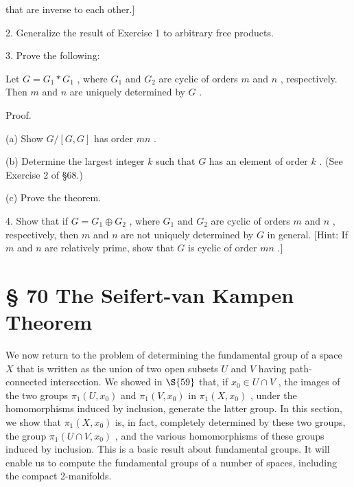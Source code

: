 that are inverse to each other.]

2. Generalize the result of Exercise 1 to arbitrary free products.

3. Prove the following:

\begin{theorem} Let \(G = {G}_{1} * {G}_{1}\) , where \({G}_{1}\) and \({G}_{2}\) are cyclic of orders \(m\) and \(n\) , respectively. Then \(m\) and \(n\) are uniquely determined by \(G\) .
\end{theorem}

Proof.

(a) Show \(G/\left\lbrack  {G,G}\right\rbrack\) has order \({mn}\) .

(b) Determine the largest integer \(k\) such that \(G\) has an element of order \(k\) . (See Exercise 2 of  \S 68.)

(c) Prove the theorem.

4. Show that if \(G = {G}_{1} \oplus  {G}_{2}\) , where \({G}_{1}\) and \({G}_{2}\) are cyclic of orders \(m\) and \(n\) , respectively, then \(m\) and \(n\) are not uniquely determined by \(G\) in general. [Hint: If \(m\) and \(n\) are relatively prime, show that \(G\) is cyclic of order \({mn}\) .]

\section*{§ 70 The Seifert-van Kampen Theorem}

We now return to the problem of determining the fundamental group of a space \(X\) that is written as the union of two open subsets \(U\) and \(V\) having path-connected intersection. We showed in \( \S {59}\) that, if \({x}_{0} \in  U \cap  V\) , the images of the two groups \({\pi }_{1}\left( {U,{x}_{0}}\right)\) and \({\pi }_{1}\left( {V,{x}_{0}}\right)\) in \({\pi }_{1}\left( {X,{x}_{0}}\right)\) , under the homomorphisms induced by inclusion, generate the latter group. In this section, we show that \({\pi }_{1}\left( {X,{x}_{0}}\right)\) is, in fact, completely determined by these two groups, the group \({\pi }_{1}\left( {U \cap  V,{x}_{0}}\right)\) , and the various homomorphisms of these groups induced by inclusion. This is a basic result about fundamental groups. It will enable us to compute the fundamental groups of a number of spaces, including the compact 2-manifolds.

